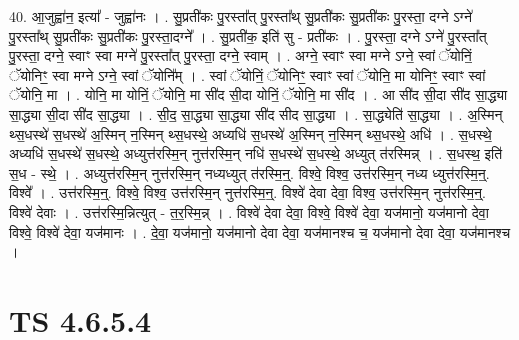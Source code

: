 \documentclass[17pt]{extarticle}
\begin{document}
40. आ॒जुह्वा॑न॒ इत्या᳚ - जुह्वा॑नः । . सु॒प्रती॑कः पु॒रस्ता᳚त् पु॒रस्ता᳚थ् सु॒प्रती॑कः सु॒प्रती॑कः पु॒रस्ता॒ दग्ने ऽग्ने॑ पु॒रस्ता᳚थ् सु॒प्रती॑कः सु॒प्रती॑कः पु॒रस्ता॒दग्ने᳚ । . सु॒प्रती॑क॒ इति॑ सु - प्रती॑कः । . पु॒रस्ता॒ दग्ने ऽग्ने॑ पु॒रस्ता᳚त् पु॒रस्ता॒ दग्ने॒ स्वाꣳ स्वा मग्ने॑ पु॒रस्ता᳚त् पु॒रस्ता॒ दग्ने॒ स्वाम् । . अग्ने॒ स्वाꣳ स्वा मग्ने ऽग्ने॒ स्वां ॅयोनिं॒ ॅयोनिꣳ॒॒ स्वा मग्ने ऽग्ने॒ स्वां ॅयोनि᳚म् । . स्वां ॅयोनिं॒ ॅयोनिꣳ॒॒ स्वाꣳ स्वां ॅयोनि॒ मा योनिꣳ॒॒ स्वाꣳ स्वां ॅयोनि॒ मा । . योनि॒ मा योनिं॒ ॅयोनि॒ मा सी॑द सी॒दा योनिं॒ ॅयोनि॒ मा सी॑द । . आ सी॑द सी॒दा सी॑द सा॒द्ध्या सा॒द्ध्या सी॒दा सी॑द सा॒द्ध्या । . सी॒द॒ सा॒द्ध्या सा॒द्ध्या सी॑द सीद सा॒द्ध्या । . सा॒द्ध्येति॑ सा॒द्ध्या । . अ॒स्मिन् थ्स॒धस्थे॑ स॒धस्थे॑ अ॒स्मिन् न॒स्मिन् थ्स॒धस्थे॒ अध्यधि॑ स॒धस्थे॑ अ॒स्मिन् न॒स्मिन् थ्स॒धस्थे॒ अधि॑ । . स॒धस्थे॒ अध्यधि॑ स॒धस्थे॑ स॒धस्थे॒ अध्युत्त॑रस्मि॒न् नुत्त॑रस्मि॒न् नधि॑ स॒धस्थे॑ स॒धस्थे॒ अध्युत् त॑रस्मिन्न् । . स॒धस्थ॒ इति॑ स॒ध - स्थे॒ । . अध्युत्त॑रस्मि॒न् नुत्त॑रस्मि॒न् नध्यध्युत् त॑रस्मि॒न्॒. विश्वे॒ विश्व॒ उत्त॑रस्मि॒न् नध्य ध्युत्त॑रस्मि॒न्॒. विश्वे᳚ । . उत्त॑रस्मि॒न्॒. विश्वे॒ विश्व॒ उत्त॑रस्मि॒न् नुत्त॑रस्मि॒न्॒. विश्वे॑ देवा देवा॒ विश्व॒ उत्त॑रस्मि॒न् नुत्त॑रस्मि॒न्॒. विश्वे॑ देवाः । . उत्त॑रस्मि॒न्नित्युत् - त॒र॒स्मि॒न्न् । . विश्वे॑ देवा देवा॒ विश्वे॒ विश्वे॑ देवा॒ यज॑मानो॒ यज॑मानो देवा॒ विश्वे॒ विश्वे॑ देवा॒ यज॑मानः । . दे॒वा॒ यज॑मानो॒ यज॑मानो देवा देवा॒ यज॑मानश्च च॒ यज॑मानो देवा देवा॒ यज॑मानश्च । \newline
\pagebreak
{}

\section{ TS 4.6.5.4 }
\end{document}
